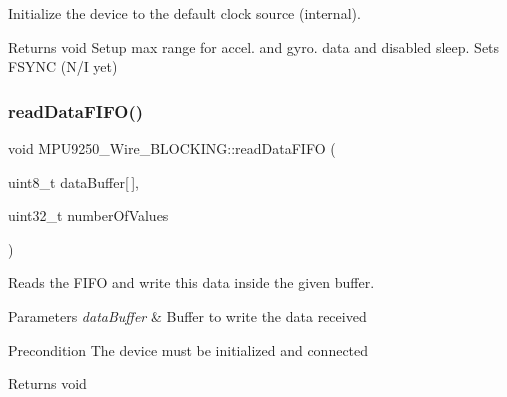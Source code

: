 Initialize the device to the default clock source (internal). 

\begin{DoxyReturn}{Returns}
void Setup max range for accel. and gyro. data and disabled sleep. Sets F\+S\+Y\+NC (N/I yet) 
\end{DoxyReturn}
\mbox{\label{class_m_p_u9250___wire___b_l_o_c_k_i_n_g_a385ee7486440d79931a9d2e7c1c7321b}} 
\subsubsection{\texorpdfstring{read\+Data\+F\+I\+F\+O()}{readDataFIFO()}}
{\footnotesize\ttfamily void M\+P\+U9250\+\_\+\+Wire\+\_\+\+B\+L\+O\+C\+K\+I\+N\+G\+::read\+Data\+F\+I\+FO (\begin{DoxyParamCaption}\item[{uint8\+\_\+t}]{data\+Buffer\mbox{[}$\,$\mbox{]},  }\item[{uint32\+\_\+t}]{number\+Of\+Values }\end{DoxyParamCaption})}



Reads the F\+I\+FO and write this data inside the given buffer. 


\begin{DoxyParams}{Parameters}
{\em data\+Buffer} & Buffer to write the data received \\
\hline
\end{DoxyParams}
\begin{DoxyPrecond}{Precondition}
The device must be initialized and connected 
\end{DoxyPrecond}
\begin{DoxyReturn}{Returns}
void 
\end{DoxyReturn}
\mbox{\label{class_m_p_u9250___wire___b_l_o_c_k_i_n_g_a800f7076178a747676b0094fd9e89a56}} 
